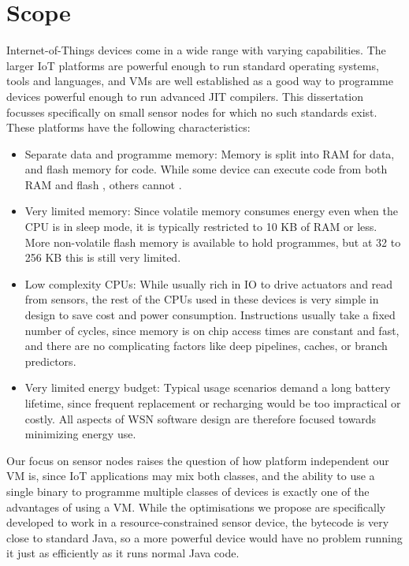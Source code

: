 \section{Scope}
\label{sec-introduction-scope}
Internet-of-Things devices come in a wide range with varying capabilities. The larger IoT platforms are powerful enough to run standard operating systems, tools and languages, and VMs are well established as a good way to programme devices powerful enough to run advanced JIT compilers. This dissertation focusses specifically on small sensor nodes for which no such standards exist. These platforms have the following characteristics:
\begin{itemize}
    \item Separate data and programme memory: Memory is split into RAM for data, and flash memory for code. While some device can execute code from both RAM and flash \cite{TexasInstrumentsIncorporated:MSP430F1611Datasheet}, others cannot \cite{Atmel:ATmega128Datasheet}.
    \item Very limited memory: Since volatile memory consumes energy even when the CPU is in sleep mode, it is typically restricted to 10 KB of RAM or less. More non-volatile flash memory is available to hold programmes, but at 32 to 256 KB this is still very limited.
    \item Low complexity CPUs: While usually rich in IO to drive actuators and read from sensors, the rest of the CPUs used in these devices is very simple in design to save cost and power consumption. Instructions usually take a fixed number of cycles, since memory is on chip access times are constant and fast, and there are no complicating factors like deep pipelines, caches, or branch predictors.
    \item Very limited energy budget: Typical usage scenarios demand a long battery lifetime, since frequent replacement or recharging would be too impractical or costly. All aspects of WSN software design are therefore focused towards minimizing energy use.
\end{itemize}

Our focus on sensor nodes raises the question of how platform independent our VM is, since IoT applications may mix both classes, and the ability to use a single binary to programme multiple classes of devices is exactly one of the advantages of using a VM. While the optimisations we propose are specifically developed to work in a resource-constrained sensor device, the bytecode is very close to standard Java, so a more powerful device would have no problem running it just as efficiently as it runs normal Java code.


